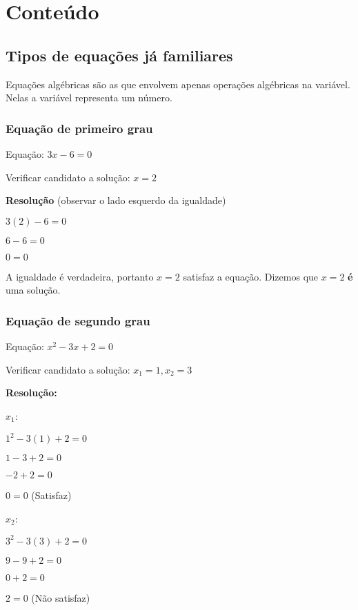 \documentclass[a4paper]{article}
\begin{document}

\section{Conteúdo}

\subsection{Tipos de equações já familiares}

Equações algébricas são as que envolvem apenas operações algébricas na
variável. Nelas a variável representa um número.

\subsubsection{Equação de primeiro grau}

Equação: $3x -6 = 0$

Verificar candidato a solução: $x=2$

{\bf Resolução} (observar o lado esquerdo da igualdade)

$3(2) - 6 =0$

$ 6-6 =0$

$0 = 0$

A igualdade é verdadeira, portanto $x=2$ satisfaz a equação. Dizemos
que $x=2$ {\bf é} uma solução.

\newpage
\subsubsection{Equação de segundo grau}

Equação: $x^2 - 3x + 2 = 0$

Verificar candidato a solução: $x_1 = 1, x_2 = 3$

{\bf Resolução:}
\begin{multicols}{2}
$x_1$:

$1^2 -3(1) + 2 = 0$

$1 - 3 + 2 = 0$

$-2 + 2 = 0$

$0=0$ (Satisfaz)

\columnbreak

$x_2$:

$3^2 -3(3) +2 = 0$

$9-9+2 = 0 $

$0 + 2 = 0$

$2=0$ (Não satisfaz)

\end{multicols}
\end{document}
